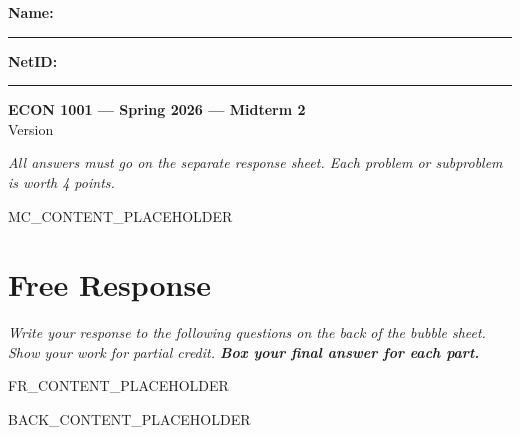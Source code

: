 \documentclass[12pt]{article}
\begin{document}
\pagestyle{fancy}
\fancyhf{}
\fancyfoot[C]{\thepage}
\renewcommand{\headrulewidth}{0pt} %
\renewcommand{\footrulewidth}{0pt} %
\thispagestyle{empty}

\noindent\textbf{Name:} \rule{3.5in}{0.4pt} \hfill \textbf{NetID:} \rule{1.8in}{0.4pt}

\begin{center}
  {\Large\textbf{ECON 1001 — Spring 2026 — Midterm 2}}\\[0.2em]
  {\large Version }
\end{center}

\noindent\emph{All answers must go on the separate response sheet. Each problem or subproblem is worth 4 points.}


\begin{questions}
  MC_CONTENT_PLACEHOLDER
\end{questions}

\section*{Free Response}
\noindent\emph{Write your response to the following questions on the back of the bubble sheet. Show your work for partial credit. \textbf{Box your final answer for each part.}}

\begin{questions}[resume]
  FR_CONTENT_PLACEHOLDER
\end{questions}

\newpage
BACK_CONTENT_PLACEHOLDER
\end{document}
